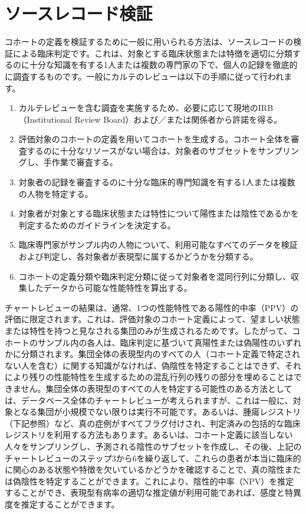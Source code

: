 \documentclass[
  11pt]{book}
\theoremstyle{definition}
\theoremstyle{definition}
\theoremstyle{definition}
\theoremstyle{definition}
\theoremstyle{remark}
\begin{document}
\section{ソースレコード検証}\label{ux30bdux30fcux30b9ux30ecux30b3ux30fcux30c9ux691cux8a3c}


コホートの定義を検証するために一般に用いられる方法は、ソースレコードの検証による臨床判定です。これは、対象とする臨床状態または特徴を適切に分類するのに十分な知識を有する1人または複数の専門家の下で、個人の記録を徹底的に調査するものです。一般にカルテのレビューは以下の手順に従って行われます。

\begin{enumerate}
\def\labelenumi{\arabic{enumi}.}
\item
  カルテレビューを含む調査を実施するため、必要に応じて現地のIRB（Institutional Review Board）および／または関係者から許諾を得る。
\item
  評価対象のコホートの定義を用いてコホートを生成する。コホート全体を審査するのに十分なリソースがない場合は、対象者のサブセットをサンプリングし、手作業で審査する。
\item
  対象者の記録を審査するのに十分な臨床的専門知識を有する1人または複数の人物を特定する。
\item
  対象者が対象とする臨床状態または特性について陽性または陰性であるかを判定するためのガイドラインを決定する。
\item
  臨床専門家がサンプル内の人物について、利用可能なすべてのデータを検証および判定し、各対象者が表現型に属するかどうかを分類する。
\item
  コホートの定義分類や臨床判定分類に従って対象者を混同行列に分類し、収集したデータから可能な性能特性を算出する。
\end{enumerate}

チャートレビューの結果は、通常、1つの性能特性である陽性的中率（PPV）の評価に限定されます。これは、評価対象のコホート定義によって、望ましい状態または特性を持つと見なされる集団のみが生成されるためです。したがって、コホートのサンプル内の各人は、臨床判定に基づいて真陽性または偽陽性のいずれかに分類されます。集団全体の表現型内のすべての人（コホート定義で特定されない人を含む）に関する知識がなければ、偽陰性を特定することはできず、それにより残りの性能特性を生成するための混乱行列の残りの部分を埋めることはできません。集団全体の表現型のすべての人を特定する可能性のある方法としては、データベース全体のチャートレビューが考えられますが、これは一般に、対象となる集団が小規模でない限りは実行不可能です。あるいは、腫瘍レジストリ（下記参照）など、真の症例がすべてフラグ付けされ、判定済みの包括的な臨床レジストリを利用する方法もあります。あるいは、コホート定義に該当しない人々をサンプリングし、予測される陰性のサブセットを作成し、その後、上記の チャートレビューのステップ3から6を繰り返して、これらの患者が本当に臨床的に関心のある状態や特徴を欠いているかどうかを確認することで、真の陰性または偽陰性を特定することができます。これにより、陰性的中率（NPV）を推定することができ、表現型有病率の適切な推定値が利用可能であれば、感度と特異度を推定することができます。
\end{document}

